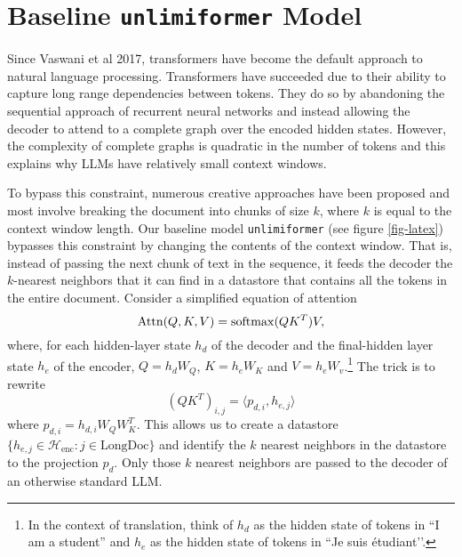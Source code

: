 \section*{Baseline \texttt{unlimiformer} Model}

Since Vaswani et al 2017, transformers have become the default approach to
natural language processing. Transformers have succeeded due to their ability
to capture long range dependencies between tokens. They do so by abandoning the
sequential approach of recurrent neural networks and instead allowing the
decoder to attend to a complete graph over the encoded hidden states. However,
the complexity of complete graphs is quadratic in the number of tokens and this
explains why LLMs have relatively small context windows. 


To bypass this constraint, numerous creative approaches have been proposed and
most involve breaking the document into chunks of size $k$, where $k$ is equal
to the context window length. Our baseline model \texttt{unlimiformer} (see
figure \ref{fig-latex}) bypasses this constraint by changing the contents of
the context window. That is, instead of passing the next chunk of text in the
sequence, it feeds the decoder the $k$-nearest neighbors that it can find in a
datastore that contains all the tokens in the entire document. Consider a
simplified equation of attention \[\text{Attn}(Q, K, V) = \operatorname{softmax} (Q K^T) V,\]
where, for each hidden-layer state $h_d$ of the decoder and the final-hidden
layer state $h_e$ of the encoder,  $Q = h_d W_Q$, $K = h_e W_K$ and $V = h_e
W_v$.\footnote{In the context of translation, think of $h_d$ as the hidden
  state of tokens in ``I am a student” and $h_e$ as the hidden state of tokens
in ``Je suis \'{e}tudiant’’.} The trick is to rewrite  \[(Q K ^T)_{i, j} =
\langle p_{d,i}, h_{e, j}\rangle\] where $p_{d, i} = h_{d, i} W_Q W_K^T$.
This allows us to create a datastore  $\{h_{e, j} \in \mathcal H_{\text{enc}}
: j \in \text{LongDoc}\}$ and identify the $k$ nearest neighbors in the
datastore to the  projection $p_d$. Only those $k$ nearest neighbors are
passed to the decoder of an otherwise standard LLM.

